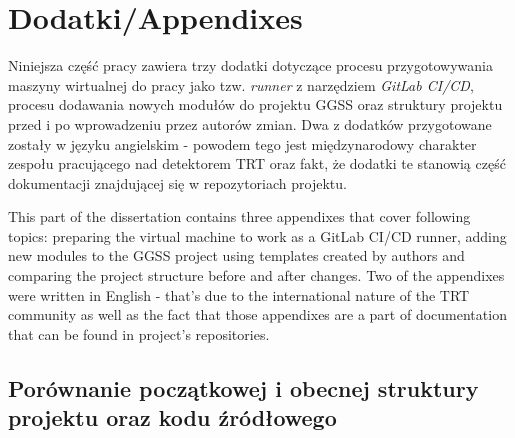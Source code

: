 \appendix
\chapter{Dodatki/Appendixes}
\label{cha:app}
Niniejsza część pracy zawiera trzy dodatki dotyczące procesu przygotowywania maszyny wirtualnej do pracy jako tzw. \textit{runner} z narzędziem \textit{GitLab CI/CD}, procesu dodawania nowych modułów do projektu GGSS oraz struktury projektu przed i po wprowadzeniu przez autorów zmian. Dwa z dodatków przygotowane zostały w języku angielskim - powodem tego jest międzynarodowy charakter zespołu pracującego nad detektorem TRT oraz fakt, że dodatki te stanowią część dokumentacji znajdującej się w repozytoriach projektu.

This part of the dissertation contains three appendixes that cover following topics: preparing the virtual machine to work as a GitLab CI/CD runner, adding new modules to the GGSS project using templates created by authors and comparing the project structure before and after changes. Two of the appendixes were written in English - that's due to the international nature of the TRT community as well as the fact that those appendixes are a part of documentation that can be found in project's repositories. 

\section{Porównanie początkowej i obecnej struktury projektu oraz kodu źródłowego}


\newpage

\twocolumn


\def\redcolor{\color{red}}
\def\blackcolor{\color{black}}
\def\greencolor{\color{green}}
\def\purplecolor{\color{plum(traditional)}}
\def\bluecolor{\color{blue}}
\def\ambercolor{\color{amber(sae/ece)}}
\def\darkgreencolor{\color{cadmiumgreen}}
\def\capricolor{\color{capri}}
\def\magentacolor{\color{magenta}}
\def\sinopiacolor{\color{sinopia}}

